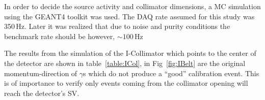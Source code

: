 In order to decide the source activity and collimator dimensions, a MC simulation using the GEANT4 toolkit was used. The DAQ rate assumed for this study was 350\,Hz. Later it was realized that due to noise and purity conditions the benchmark rate should be however, $\sim100$\,Hz 

The results from the simulation of the I-Collimator which points to the center of the detector are shown in table~\ref{table:ICol}, in Fig~\ref{fig:IBelt} are the original momentum-direction of $\gamma$s which do not produce a ``good'' calibration event. This is of importance to verify only events coming from the collimator opening will reach the detector's SV.


\begin{table}
\begin{center}

\label{table:ICol}
\end{center}
\end{table}


